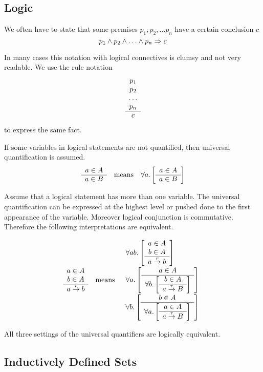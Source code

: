 \subsection{Logic}

We often have to state that some premises $p_1, p_2, \ldots p_n$ have a certain
conclusion $c$
$$
p_1 \land p_2 \land \ldots \land p_n \Rightarrow c
$$

In many cases this notation with logical connectives is clumsy and not very
readable. We use the rule notation
$$
\begin{array}{c} p_1 \\ p_2 \\ \ldots \\ p_n \\ \hline c\end{array}
$$
to express the same fact.


If some variables in logical statements are not quantified, then universal
quantification is assumed.
$$
\begin{array}{ccc}

    \ruleh{a \in A}{a \in B}
    &
    \text{means}
    &
    \allbracket a {\ruleh {a \in A}{a \in B}}

\end{array}
$$

Assume that a logical statement has more than one variable. The universal
quantification can be expressed at the highest level or pushed done to the first
appearance of the variable. Moreover logical conjunction is commutative.
Therefore the following interpretations are equivalent.

$$
\begin{array}{ccc}
    \begin{array}{c} a \in A \\ b \in A \\ \hline a \stackrel{r}{\to} b\end{array}
    &
    \text{means}
    &
    \begin{array}{l}
        \forall ab. \left[ \begin{array}{c} a \in A \\ b \in A \\ \hline a \stackrel{r}{\to} b\end{array} \right]
        \\
        \forall a. \left[ 
            \begin{array}{c} a \in A \\ \hline \forall b. \left[ \begin{array}{c} b \in A \\ \hline a \stackrel{r}{\to} B\end{array} \right]\end{array}
         \right]
        \\
        \forall b. \left[ 
            \begin{array}{c} b \in A \\ \hline \forall a. \left[ \begin{array}{c} a \in A \\ \hline a \stackrel{r}{\to} B\end{array} \right]\end{array}
         \right]
    \end{array}
\end{array}
$$

All three settings of the universal quantifiers are logically equivalent.




\subsection{Inductively Defined Sets}

